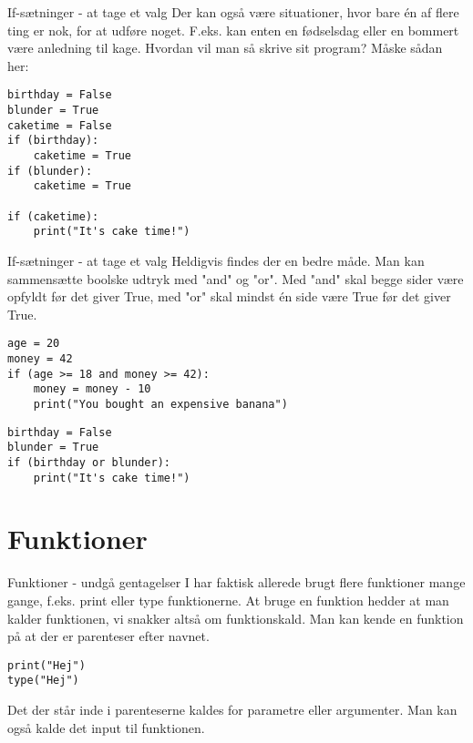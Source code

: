 \documentclass[main.tex]{subfiles}
\begin{document}
\begin{frame}[fragile]{If-sætninger - at tage et valg}
	Der kan også være situationer, hvor bare én af flere ting er nok, for at udføre noget. F.eks. kan enten en fødselsdag eller en bommert være anledning til kage. Hvordan vil man så skrive sit program? Måske sådan her:
	\begin{lstlisting}[style=python]
birthday = False
blunder = True
caketime = False
if (birthday):
	caketime = True
if (blunder):
	caketime = True
	
if (caketime):
	print("It's cake time!")
	\end{lstlisting}
\end{frame}


\begin{frame}[fragile]{If-sætninger - at tage et valg}
	Heldigvis findes der en bedre måde. Man kan sammensætte boolske udtryk med "and" og "or". Med "and" skal begge sider være opfyldt før det giver True, med "or" skal mindst én side være True før det giver True.
	\begin{lstlisting}[style=python]
age = 20
money = 42
if (age >= 18 and money >= 42):
	money = money - 10
	print("You bought an expensive banana")
	\end{lstlisting}
	
	\begin{lstlisting}[style=python]
birthday = False
blunder = True
if (birthday or blunder):
	print("It's cake time!")
	\end{lstlisting}
\end{frame}





\section{Funktioner}

\begin{frame}[fragile]{Funktioner - undgå gentagelser}
	I har faktisk allerede brugt flere funktioner mange gange, f.eks. print eller type funktionerne. At bruge en funktion hedder at man kalder funktionen, vi snakker altså om funktionskald. Man kan kende en funktion på at der er parenteser efter navnet.
	
	\begin{lstlisting}[style=python]
print("Hej")
type("Hej")
	\end{lstlisting}
	
	Det der står inde i parenteserne kaldes for parametre eller argumenter. Man kan også kalde det input til funktionen.
\end{frame}
\end{document}
